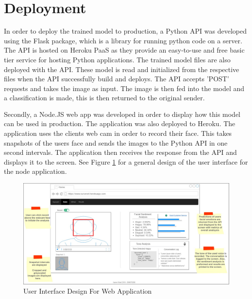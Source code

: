 \section{Deployment}
In order to deploy the trained model to production, a Python API was developed using the Flask package, which is a library for running python code on a server. The API is hosted on Heroku PaaS as they provide an easy-to-use and free basic tier service for hosting Python applications. The trained model files are also deployed with the API. These model is read and initialized from the respective files when the API successfully build and deploys. The API accepts 'POST' requests and takes the image as input. The image is then fed into the model and a classification is made, this is then returned to the original sender.

Secondly, a Node.JS web app was developed in order to display how this model can be used in production. The application was also deployed to Heroku. The application uses the clients web cam in order to record their face. This takes snapshots of the users face and sends the images to the Python API in one second intervals. The application then receives the response from the API and displays it to the screen. 
See Figure \ref{ui} for a general design of the user interface for the node application.


\begin{figure}[ht]
	\begin{center}
		\advance\leftskip-3cm
		\advance\rightskip-3cm
		\includegraphics[keepaspectratio=true,scale=0.35]{__resources/Design/mockup_annotated.jpg}
		\caption{User Interface Design For Web Application}
		\label{ui}
	\end{center}
\end{figure}


